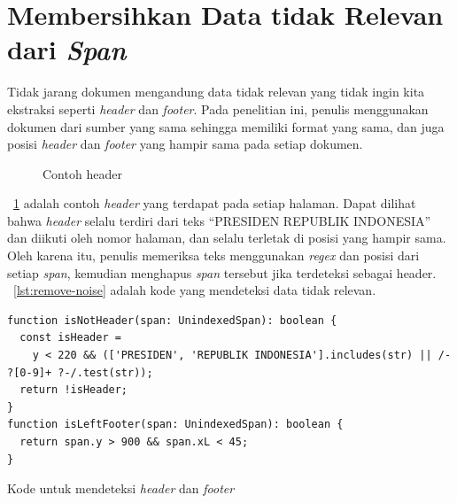 \section{Membersihkan Data tidak Relevan dari \textit{Span}}
\label{membersihkan-noise-dari-halaman}

Tidak jarang dokumen \legal mengandung data tidak relevan yang tidak ingin kita ekstraksi seperti
\textit{header} dan \textit{footer}. Pada penelitian ini, penulis menggunakan dokumen dari sumber
yang sama sehingga memiliki format yang sama, dan juga posisi \textit{header} dan \textit{footer}
yang hampir sama pada setiap dokumen.

\begin{figure}[H]
  \centering
  \caption{Contoh header}
  \label{fig:contoh-header}
\end{figure}

\pic~\ref{fig:contoh-header} adalah contoh \textit{header} yang terdapat pada setiap halaman. Dapat
dilihat bahwa \textit{header} selalu terdiri dari teks ``PRESIDEN REPUBLIK INDONESIA'' dan diikuti
oleh nomor halaman, dan selalu terletak di posisi yang hampir sama. Oleh karena itu, penulis
memeriksa teks menggunakan \textit{regex} dan posisi dari setiap \textit{span}, kemudian menghapus
\textit{span} tersebut jika terdeteksi sebagai header. \lst~\ref{lst:remove-noise} adalah kode yang
mendeteksi data tidak relevan.

\begin{listing}[H]
  \begin{verbatim}
function isNotHeader(span: UnindexedSpan): boolean {
  const isHeader =
    y < 220 && (['PRESIDEN', 'REPUBLIK INDONESIA'].includes(str) || /- ?[0-9]+ ?-/.test(str));
  return !isHeader;
}
function isLeftFooter(span: UnindexedSpan): boolean {
  return span.y > 900 && span.xL < 45;
}

\end{verbatim}
  \caption{Kode untuk mendeteksi \textit{header} dan \textit{footer}}
  \label{lst:remove-noise}
\end{listing}

